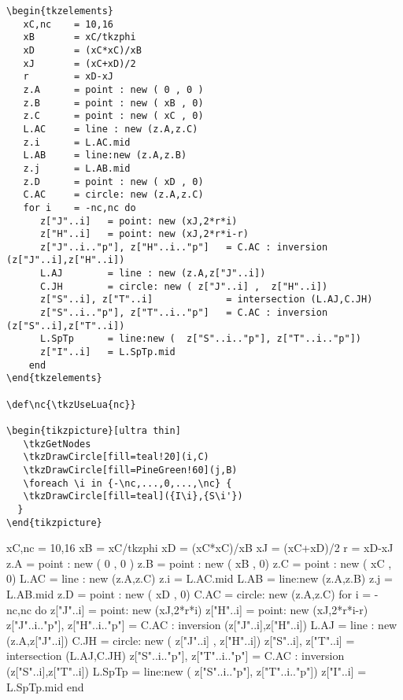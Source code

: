 \begin{verbatim}
\begin{tkzelements}
   xC,nc    = 10,16
   xB       = xC/tkzphi
   xD       = (xC*xC)/xB
   xJ       = (xC+xD)/2
   r        = xD-xJ
   z.A      = point : new ( 0 , 0 )
   z.B      = point : new ( xB , 0)
   z.C      = point : new ( xC , 0)
   L.AC     = line : new (z.A,z.C)
   z.i      = L.AC.mid
   L.AB     = line:new (z.A,z.B)
   z.j      = L.AB.mid
   z.D      = point : new ( xD , 0)
   C.AC     = circle: new (z.A,z.C)
   for i    = -nc,nc do
      z["J"..i]   = point: new (xJ,2*r*i)
      z["H"..i]   = point: new (xJ,2*r*i-r)
      z["J"..i.."p"], z["H"..i.."p"]   = C.AC : inversion (z["J"..i],z["H"..i])
      L.AJ        = line : new (z.A,z["J"..i])
      C.JH        = circle: new ( z["J"..i] ,  z["H"..i])
      z["S"..i], z["T"..i]             = intersection (L.AJ,C.JH)
      z["S"..i.."p"], z["T"..i.."p"]   = C.AC : inversion (z["S"..i],z["T"..i])
      L.SpTp      = line:new (  z["S"..i.."p"], z["T"..i.."p"])
      z["I"..i]   = L.SpTp.mid
    end
\end{tkzelements}

\def\nc{\tkzUseLua{nc}}

\begin{tikzpicture}[ultra thin]
   \tkzGetNodes
   \tkzDrawCircle[fill=teal!20](i,C)
   \tkzDrawCircle[fill=PineGreen!60](j,B)
   \foreach \i in {-\nc,...,0,...,\nc} {
   \tkzDrawCircle[fill=teal]({I\i},{S\i'})
  }
\end{tikzpicture}

\end{verbatim}

\begin{tkzelements}
   xC,nc    = 10,16
   xB       = xC/tkzphi
   xD       = (xC*xC)/xB
   xJ       = (xC+xD)/2
   r        = xD-xJ
   z.A      = point : new ( 0 , 0 )
   z.B      = point : new ( xB , 0)
   z.C      = point : new ( xC , 0)
   L.AC     = line : new (z.A,z.C)
   z.i      = L.AC.mid
   L.AB     = line:new (z.A,z.B)
   z.j      = L.AB.mid
   z.D      = point : new ( xD , 0)
   C.AC     = circle: new (z.A,z.C)
   for i    = -nc,nc do
      z["J"..i]   = point: new (xJ,2*r*i)
      z["H"..i]   = point: new (xJ,2*r*i-r)
      z["J"..i.."p"], z["H"..i.."p"]   = C.AC : inversion (z["J"..i],z["H"..i])
      L.AJ        = line : new (z.A,z["J"..i])
      C.JH        = circle: new ( z["J"..i] ,  z["H"..i])
      z["S"..i], z["T"..i]             = intersection (L.AJ,C.JH)
      z["S"..i.."p"], z["T"..i.."p"]   = C.AC : inversion (z["S"..i],z["T"..i])
      L.SpTp      = line:new (  z["S"..i.."p"], z["T"..i.."p"])
      z["I"..i]   = L.SpTp.mid
    end
\end{tkzelements}

